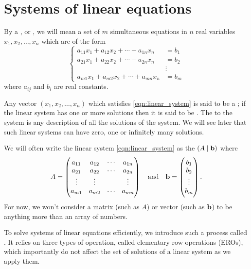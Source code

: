 \section{Systems of linear equations}
\begin{definition}
By a , or , we will mean a set of $m$ simultaneous equations in $n$ real variables $x_1,x_2,\dots,x_n$ which are of the form
\begin{equation}\label{eqn:linear_system}
\begin{cases}
a_{11}x_1+a_{12}x_2+\cdots+a_{1n}x_n&=b_1 \\
a_{21}x_1+a_{22}x_2+\cdots+a_{2n}x_n&=b_2 \\
&\vdots \\
a_{m1}x_1+a_{m2}x_2+\cdots+a_{mn}x_n&=b_m
\end{cases}
\end{equation}
\[  \]
where $a_{ij}$ and $b_i$ are real constants.
\end{definition}

Any vector $(x_1,x_2,\dots,x_n)$ which satisfies \cref{eqn:linear_system} is said to be a ; if the linear system has one or more solutions then it is said to be . The  to the system is any description of all the solutions of the system. We will see later that such linear systems can have zero, one or infinitely many solutions.

We will often write the linear system \cref{eqn:linear_system} as the  $(A\mid\vb{b})$ where
\[ A=\begin{pmatrix}
    a_{11} & a_{12} & \cdots & a_{1n} \\
    a_{21} & a_{22} & \cdots & a_{2n} \\
    \vdots & \vdots & & \vdots \\ 
    a_{m1} & a_{m2} & \cdots & a_{mn}
\end{pmatrix} \quad \text{and} \quad 
\vb{b}=\begin{pmatrix}b_1\\b_2\\\vdots\\b_m\end{pmatrix}. \]
For now, we won't consider a matrix (such as $A$) or vector (such as $\vb{b}$) to be anything more than an array of numbers.

To solve systems of linear equations efficiently, we introduce such a process called . It relies on three types of operation, called elementary row operations (EROs), which importantly do not affect the set of solutions of a linear system as we apply them.

